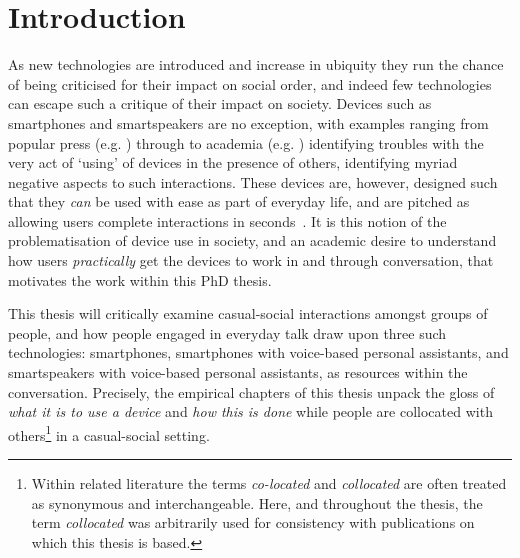 


\chapter{Introduction}\label{ch:intro}



\begin{revisedsubmission}
As new technologies are introduced and increase in ubiquity they run the chance of being criticised for their impact on social order, and indeed few technologies can escape such a critique of their impact on society.
Devices such as smartphones and smartspeakers are no exception, with examples ranging from popular press (e.g. \citet{Turkle2011}) through to academia (e.g. \citet{Su2015}) identifying troubles with the very act of `using' of devices in the presence of others, identifying myriad negative aspects to such interactions.
These devices are, however, designed such that they \textit{can} be used with ease as part of everyday life, and are pitched as allowing users complete interactions in seconds~\citep{Brown2014}.
It is this notion of the problematisation of device use in society, and an academic desire to understand how users \textit{practically} get the devices to work in and through conversation, that motivates the work within this PhD thesis.


This thesis will critically examine casual-social interactions amongst groups of people, and how people engaged in everyday talk draw upon three such technologies: smartphones, smartphones with voice-based personal assistants, and smartspeakers with voice-based personal assistants, as resources within the conversation.
Precisely, the empirical chapters of this thesis unpack the gloss of \textit{what it is to use a device} and \textit{how this is done} while people are collocated with others\footnote{Within related literature the terms \textit{co-located} and \textit{collocated} are often treated as synonymous and interchangeable.
Here, and throughout the thesis, the term \textit{collocated} was arbitrarily used for consistency with publications on which this thesis is based.} in a casual-social setting.


\end{revisedsubmission}

